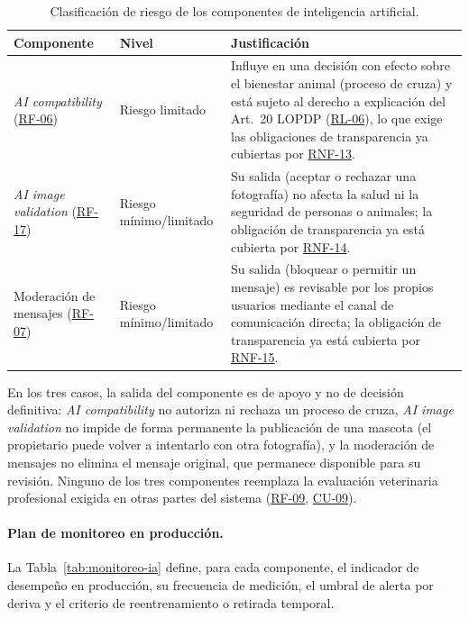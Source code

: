 \documentclass[journal,onecolumn]{IEEEtran}
\begin{document}
\begin{table}[H]
	\centering
	\caption{Clasificación de riesgo de los componentes de inteligencia artificial.}
	\label{tab:riesgo-ia}
	\small
	\begin{tabularx}{\textwidth}{@{}p{2.3cm} p{2.0cm} X@{}}
		\toprule
		\textbf{Componente} & \textbf{Nivel} & \textbf{Justificación} \\
		\midrule
		\emph{AI compatibility} (\hyperref[tab:RF-06]{RF-06}) & Riesgo limitado & Influye en una decisión con efecto sobre el bienestar animal (proceso de cruza) y está sujeto al derecho a explicación del Art.~20 LOPDP (\hyperref[rl:06]{RL-06}), lo que exige las obligaciones de transparencia ya cubiertas por \hyperref[tab:RNF-13]{RNF-13}. \\
		\addlinespace
		\emph{AI image validation} (\hyperref[tab:RF-17]{RF-17}) & Riesgo mínimo/limitado & Su salida (aceptar o rechazar una fotografía) no afecta la salud ni la seguridad de personas o animales; la obligación de transparencia ya está cubierta por \hyperref[tab:RNF-14]{RNF-14}. \\
		\addlinespace
		Moderación de mensajes (\hyperref[tab:RF-07]{RF-07}) & Riesgo mínimo/limitado & Su salida (bloquear o permitir un mensaje) es revisable por los propios usuarios mediante el canal de comunicación directa; la obligación de transparencia ya está cubierta por \hyperref[tab:RNF-15]{RNF-15}. \\
		\bottomrule
	\end{tabularx}
\end{table}

En los tres casos, la salida del componente es de apoyo y no de decisión
definitiva: \emph{AI compatibility} no autoriza ni rechaza un proceso de
cruza, \emph{AI image validation} no impide de forma permanente la
publicación de una mascota (el propietario puede volver a intentarlo con
otra fotografía), y la moderación de mensajes no elimina el mensaje
original, que permanece disponible para su revisión. Ninguno de los tres
componentes reemplaza la evaluación veterinaria profesional exigida en
otras partes del sistema (\hyperref[tab:RF-09]{RF-09}, \hyperref[tab:CU-09]{CU-09}).

\paragraph{Plan de monitoreo en producción.}
La Tabla~\ref{tab:monitoreo-ia} define, para cada componente, el
indicador de desempeño en producción, su frecuencia de medición, el
umbral de alerta por deriva y el criterio de reentrenamiento o retirada
temporal.
\end{document}
